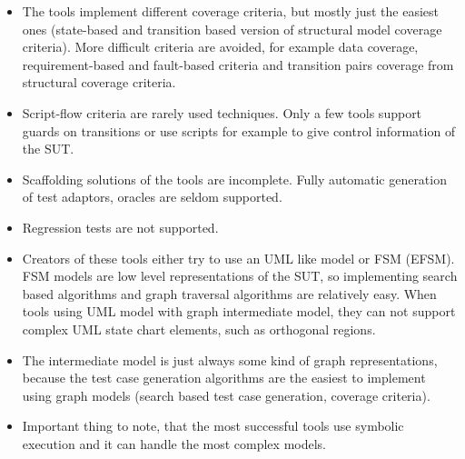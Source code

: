 \begin{itemize}
	\item The tools implement different coverage criteria, but mostly just the easiest ones (state-based and transition based version of structural model coverage criteria). More difficult criteria are avoided, for example data coverage, requirement-based and fault-based criteria and transition pairs coverage from structural coverage criteria.
	\item Script-flow criteria are rarely used techniques. Only a few tools support guards on transitions or use scripts for example to give control information of the SUT.
	\item Scaffolding solutions of the tools are incomplete. Fully automatic generation of test adaptors, oracles are seldom supported.
	\item Regression tests are not supported.
	\item Creators of these tools either try to use an UML like model or FSM (EFSM). FSM models are low level representations of the SUT, so implementing search based algorithms and graph traversal algorithms are relatively easy. When tools using UML model with graph intermediate model, they can not support complex UML state chart elements, such as orthogonal regions.
	\item The intermediate model is just always some kind of graph representations, because the test case generation algorithms are the easiest to implement using graph models (search based test case generation, coverage criteria).
	\item Important thing to note, that the most successful tools use symbolic execution and it can handle the most complex models.
\end{itemize}

